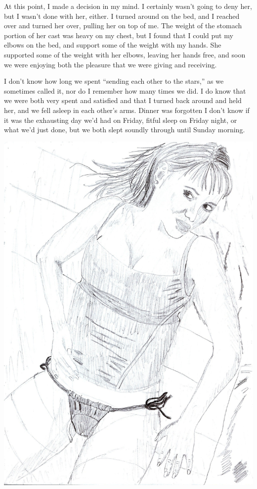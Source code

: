 At this point, I made a decision in my mind. I certainly wasn't going to deny her, but I
wasn't done with her, either. I turned around on the bed, and I reached over and turned her
over, pulling her on top of me. The weight of the stomach portion of her cast was heavy on my
chest, but I found that I could put my elbows on the bed, and support some of the weight with my
hands. She supported some of the weight with her elbows, leaving her hands free, and soon we
were enjoying both the pleasure that we were giving and receiving.

I don't know how long we spent ``sending each other to the stars,'' as we sometimes called
it, nor do I remember how many times we did. I do know that we were both very spent and
satisfied and that I turned back around and held her, and we fell asleep in each other's arms.
Dinner was forgotten I don't know if it was the exhausting day we'd had on Friday, fitful sleep
on Friday night, or what we'd just done, but we both slept soundly through until Sunday
morning.

\begin{center}
\includegraphics[width=\textwidth]{images/kicks42.jpg}
\end{center}
